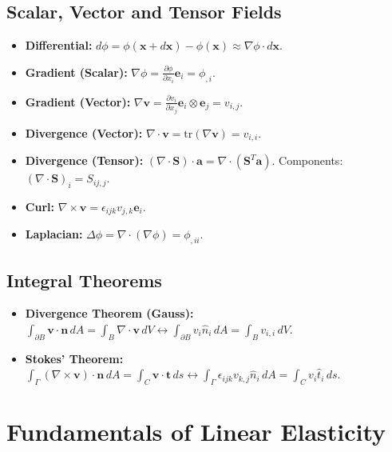 \documentclass[10pt,twocolumn, a4paper]{article}
\begin{document}
\subsection{Scalar, Vector and Tensor Fields}
\begin{itemize}
    \item \textbf{Differential:} $d\phi = \phi(\bm{x} + d\bm{x}) - \phi(\bm{x}) \approx \nabla \phi \cdot d\bm{x}$.
    \item \textbf{Gradient (Scalar):} $\nabla \phi = \frac{\partial \phi}{\partial x_i} \bm{e}_i = \phi_{,i}$.
    \item \textbf{Gradient (Vector):} $\nabla \bm{v} = \frac{\partial v_i}{\partial x_j} \bm{e}_i \otimes \bm{e}_j = v_{i,j}$.
    \item \textbf{Divergence (Vector):} $\nabla \cdot \bm{v} = \text{tr}(\nabla \bm{v}) = v_{i,i}$.
    \item \textbf{Divergence (Tensor):} $(\nabla \cdot \bm{S}) \cdot \bm{a} = \nabla \cdot (\bm{S}^T \bm{a})$. Components: $(\nabla \cdot \bm{S})_i = S_{ij,j}$.
    \item \textbf{Curl:} $\nabla \times \bm{v} = \epsilon_{ijk} v_{j,k} \bm{e}_i$.
    \item \textbf{Laplacian:} $\Delta \phi = \nabla \cdot (\nabla \phi) = \phi_{,ii}$.
\end{itemize}

\subsection{Integral Theorems}
\begin{itemize}
    \item \textbf{Divergence Theorem (Gauss):} $\int_{\partial B} \bm{v} \cdot \bm{n} \, dA = \int_B \nabla \cdot \bm{v} \, dV \leftrightarrow \int_{\partial B} v_i \hat{n}_i \, dA = \int_B v_{i,i} \, dV$.
    \item \textbf{Stokes' Theorem:} $\int_{\Gamma} (\nabla \times \bm{v}) \cdot \bm{n} \, dA = \int_C \bm{v} \cdot \bm{t} \, ds \leftrightarrow \int_{\Gamma} \epsilon_{ijk} v_{k,j} \hat{n}_i \, dA = \int_C v_i \hat{t}_i \, ds$.
\end{itemize}

\section{Fundamentals of Linear Elasticity}
\end{document}

